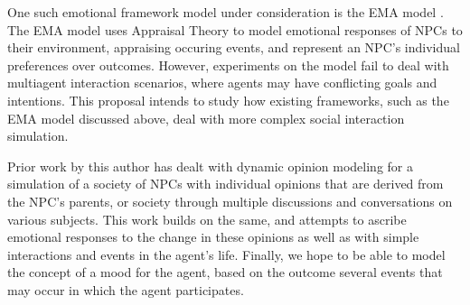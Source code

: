 \documentclass[letterpaper]{article}
\begin{document}
One such emotional framework model under consideration is the EMA model \cite{gratch2004domain}. The EMA model uses Appraisal Theory to model emotional responses of NPCs to their environment, appraising occuring events, and represent an NPC's individual preferences over outcomes. However, experiments on the model fail to deal with multiagent interaction scenarios, where agents may have conflicting goals and intentions. This proposal intends to study how existing frameworks, such as the EMA model discussed above, deal with more complex social interaction simulation. 

Prior work by this author has dealt with dynamic opinion modeling for a simulation of a society of NPCs with individual opinions that are derived from the NPC's parents, or society through multiple discussions and conversations on various subjects. This work builds on the same, and attempts to ascribe emotional responses to the change in these opinions as well as with simple interactions and events in the agent's life. Finally, we hope to be able to model the concept of a mood for the agent, based on the outcome several events that may occur in which the agent participates. 

{
\fontsize{9.5pt}{10.5pt} \selectfont


}
\end{document}
